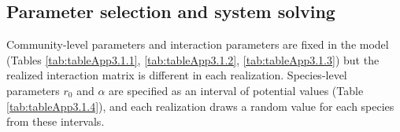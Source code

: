 \normalsize

\subsection*{Parameter selection and system solving}\label{parameter-selection-and-system-solving}

Community-level parameters and interaction parameters are fixed in the model (Tables \ref{tab:tableApp3.1.1}, \ref{tab:tableApp3.1.2}, \ref{tab:tableApp3.1.3}) but the realized interaction matrix is different in each realization. Species-level parameters \(r_0\) and \(\alpha\) are specified as an interval of potential values (Table \ref{tab:tableApp3.1.4}), and each realization draws a random value for each species from these intervals.\\

\small


